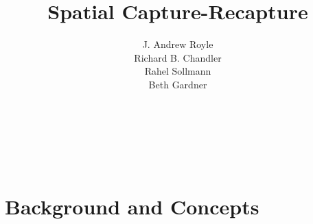 \documentclass{book}
\begin{document}
\title{ Spatial Capture-Recapture  }
\subtitle{
}
\author{J. Andrew Royle \\
Richard B. Chandler \\
Rahel Sollmann \\
Beth Gardner}


\address{
USGS Patuxent Wildlife Research Center \\
North Carolina State University
}

\maketitle

\newpage


\setcounter{tocdepth}{2}
\tableofcontents


\newpage

\hspace*{-.166in}{\LARGE Preface} \\

\vspace*{.2in}



\newpage

\hspace*{-.166in}{\LARGE Acknowledgements} \\

\vspace*{.2in}

%

\newpage



\mainmatter




\part{Background and Concepts}


\end{document}
